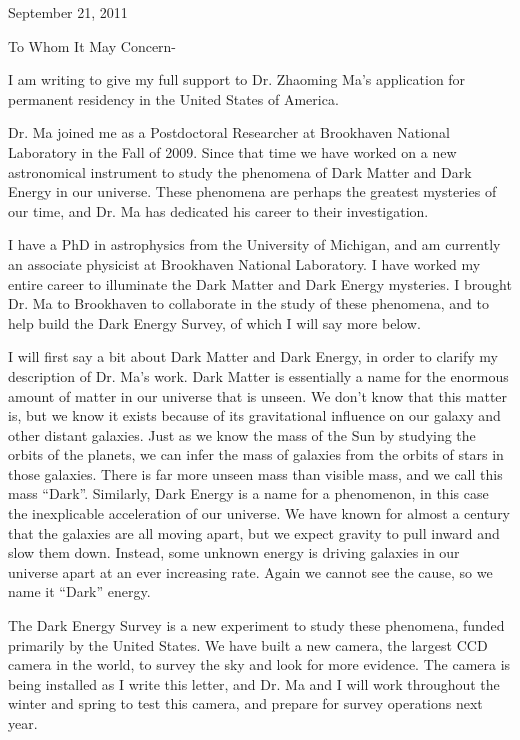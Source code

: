 \documentclass[12pt]{letter}
\begin{document}
\hfill September 21,  2011
\newline

To Whom It May Concern-

I am writing to give my full support to Dr. Zhaoming Ma's application for
permanent residency in the United States of America.

Dr. Ma joined me as a Postdoctoral Researcher at Brookhaven National Laboratory
in the Fall of 2009.  Since that time we have worked on a new astronomical
instrument to study the phenomena of Dark Matter and Dark Energy in our
universe.  These phenomena are perhaps the greatest mysteries of our time, and
Dr. Ma has dedicated his career to their investigation.

I have a PhD in astrophysics from the University of Michigan, and am currently
an associate physicist at Brookhaven National Laboratory.  I have worked my
entire career to illuminate the Dark Matter and Dark Energy mysteries.  I
brought Dr. Ma to Brookhaven to collaborate in the study of these phenomena,
and to help build the Dark Energy Survey, of which I will say more below.

I will first say a bit about Dark Matter and Dark Energy, in order to clarify
my description of Dr. Ma's work.  Dark Matter is essentially a name for the
enormous amount of matter in our universe that is unseen.  We don't know that
this matter is, but we know it exists because of its gravitational influence on
our galaxy and other distant galaxies.  Just as we know the mass of the Sun by
studying the orbits of the planets, we can infer the mass of galaxies from the
orbits of stars in those galaxies.  There is far more unseen mass than visible
mass, and we call this mass ``Dark''.  Similarly, Dark Energy is a name for a
phenomenon, in this case the inexplicable acceleration of our universe. We have
known for almost a century that the galaxies are all moving apart, but we
expect gravity to pull inward and slow them down.  Instead, some unknown energy
is driving galaxies in our universe apart at an ever increasing rate.  Again
we cannot see the cause, so we name it ``Dark'' energy.

The Dark Energy Survey is a new experiment to study these phenomena, funded
primarily by the United States.  We have built a new camera, the largest CCD
camera in the world, to survey the sky and look for more evidence.  The camera
is being installed as I write this letter, and Dr. Ma and I will work
throughout the winter and spring to test this camera, and prepare for survey
operations next year.
\end{document}
